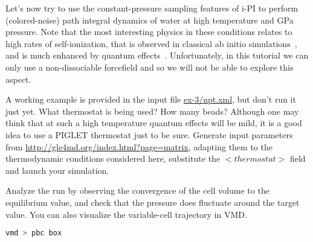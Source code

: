 \documentclass{article}
\begin{document}
\begin{Exercise}[label={npt},title={Variable-cell sampling}]

Let's now try to use the constant-pressure sampling features of i-PI to 
perform (colored-noise) path integral dynamics of water at high temperature
and GPa pressure. Note that the most interesting physics in these conditions
relates to high rates of self-ionization, that is observed in classical ab 
initio simulations~\cite{schw+01prl}, and is much enhanced by quantum 
effects~\cite{ceri+14cpc}. Unfortunately, in this tutorial we can only use
a non-dissociable forcefield and so we will not be able to explore this
aspect. 

\Question A working example is provided in the input file \url{ex-3/npt.xml}, 
but don't run it just yet. What thermostat is being used? How many beads? 
Although one may think that at such a high temperature quantum effects will be 
mild, it is a good idea to use a PIGLET thermostat just to be sure. 
Generate input parameters from \url{http://gle4md.org/index.html?page=matrix},
adapting them to the thermodynamic conditions considered here, substitute
the \lstinxml$<thermostat>$ field and launch your simulation. 

\Question Analyze the run by observing the convergence of the cell volume
to the equilibrium value, and check that the pressure does fluctuate around the
target value. You can also visualize the variable-cell trajectory in VMD.
\begin{lstlisting}[language=bash]
vmd > pbc box
\end{lstlisting}



\end{Exercise}
\end{document}

